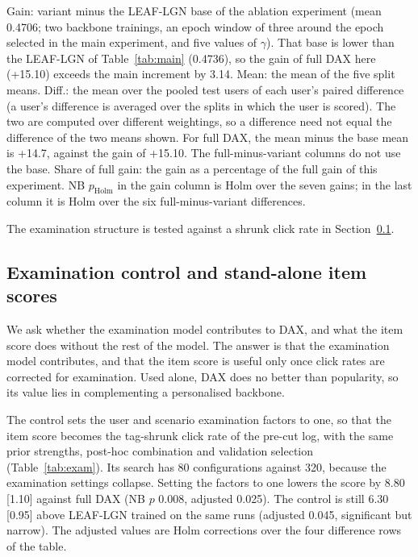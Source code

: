 \documentclass[preprint,12pt,authoryear]{elsarticle}
\begin{document}
\begin{table}[tbp]
\begin{minipage}{\linewidth}\raggedright\footnotesize Gain: variant minus the LEAF-LGN base of the ablation experiment (mean 0.4706; two backbone trainings, an epoch window of three around the epoch selected in the main experiment, and five values of $\gamma$). That base is lower than the LEAF-LGN of Table~\ref{tab:main} (0.4736), so the gain of full DAX here (+15.10) exceeds the main increment by 3.14. Mean: the mean of the five split means. Diff.: the mean over the pooled test users of each user's paired difference (a user's difference is averaged over the splits in which the user is scored). The two are computed over different weightings, so a difference need not equal the difference of the two means shown. For full DAX, the mean minus the base mean is +14.7, against the gain of +15.10. The full-minus-variant columns do not use the base. Share of full gain: the gain as a percentage of the full gain of this experiment. NB $p_{\mathrm{Holm}}$ in the gain column is Holm over the seven gains; in the last column it is Holm over the six full-minus-variant differences.\end{minipage}
\end{table}


The examination structure is tested against a shrunk click rate in Section~\ref{sec:res-exam}.

\subsection{Examination control and stand-alone item scores}
\label{sec:res-exam}

We ask whether the examination model contributes to DAX, and what the item score does without the rest of the model. The answer is that
the examination model contributes, and that the item score is useful only once click rates are corrected for examination. Used alone, DAX
does no better than popularity, so its value lies in complementing a personalised backbone.

The control sets the user and scenario examination factors to one, so that the item score becomes the tag-shrunk click rate of the pre-cut
log, with the same prior strengths, post-hoc combination and validation selection (Table~\ref{tab:exam}). Its search has 80 configurations
against 320, because the examination settings collapse. Setting the factors to one lowers the score by $8.80$ [1.10] against full DAX (NB
$p$ 0.008, adjusted 0.025). The control is still $6.30$ [0.95] above LEAF-LGN trained on the same runs (adjusted 0.045, significant but
narrow). The adjusted values are Holm corrections over the four difference rows of the table.
\end{document}
